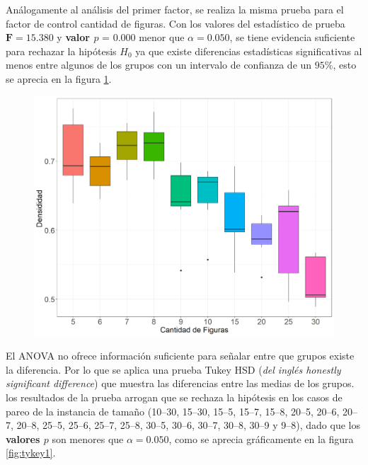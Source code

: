 \documentclass[5p,times]{elsarticle}
\begin{document}
Análogamente al análisis del primer factor, se realiza la misma prueba para el factor de control cantidad de figuras. Con los valores del estadístico de prueba $\textbf{F} = 15.380$ y \textbf{valor $p$} = 0.000 menor que $\alpha = 0.050$, se tiene evidencia suficiente para rechazar la hipótesis $H_{0}$ ya que existe diferencias estadísticas significativas al menos entre algunos de los grupos con un intervalo de confianza de un $95\%$, esto se aprecia en la figura \ref{fig:boxplotssc2}. 

	\begin{figure}
				\begin{center}
					\includegraphics[scale=0.35]{figuras/Sseccboxplotcant.png}
					\label{fig:boxplotssc2}
				\end{center}
			\end{figure}
			
El ANOVA no ofrece información suficiente para señalar entre que grupos existe la diferencia. Por lo que se aplica una prueba Tukey HSD (\textit{del inglés honestly significant difference}) que muestra las diferencias entre las medias de los grupos. los resultados de la prueba arrogan que se rechaza la hipótesis en los casos de pareo de la instancia de tamaño (10--30, 15--30, 15--5, 15--7, 15--8, 20--5, 20--6, 20--7, 20--8, 25--5, 25--6, 25--7, 25--8, 30--5, 30--6, 30--7, 30--8, 30--9 y 9--8), dado que los \textbf{valores $p$} son menores que $\alpha = 0.050$, como se aprecia gráficamente en la figura \ref{fig:tykey1}.
\end{document}
